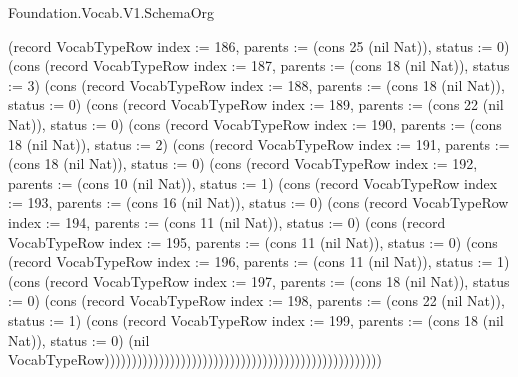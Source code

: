 \begin{lexlean}{Foundation.Vocab.V1.SchemaOrg}
\begin{semanticmodule}
{(record VocabTypeRow {index := 186, parents := (cons 25 (nil Nat)), status := 0}) (cons (record VocabTypeRow {index := 187, parents := (cons 18 (nil Nat)), status := 3}) (cons (record VocabTypeRow {index := 188, parents := (cons 18 (nil Nat)), status := 0}) (cons (record VocabTypeRow {index := 189, parents := (cons 22 (nil Nat)), status := 0}) (cons (record VocabTypeRow {index := 190, parents := (cons 18 (nil Nat)), status := 2}) (cons (record VocabTypeRow {index := 191, parents := (cons 18 (nil Nat)), status := 0}) (cons (record VocabTypeRow {index := 192, parents := (cons 10 (nil Nat)), status := 1}) (cons (record VocabTypeRow {index := 193, parents := (cons 16 (nil Nat)), status := 0}) (cons (record VocabTypeRow {index := 194, parents := (cons 11 (nil Nat)), status := 0}) (cons (record VocabTypeRow {index := 195, parents := (cons 11 (nil Nat)), status := 0}) (cons (record VocabTypeRow {index := 196, parents := (cons 11 (nil Nat)), status := 1}) (cons (record VocabTypeRow {index := 197, parents := (cons 18 (nil Nat)), status := 0}) (cons (record VocabTypeRow {index := 198, parents := (cons 22 (nil Nat)), status := 1}) (cons (record VocabTypeRow {index := 199, parents := (cons 18 (nil Nat)), status := 0}) (nil VocabTypeRow)))))))))))))))))))))))))))))))))))))))))))))))))))
}


\end{semanticmodule}
\end{lexlean}
